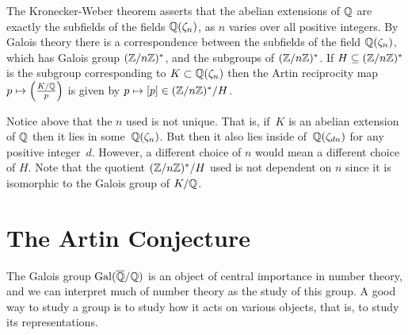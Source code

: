 The Kronecker-Weber theorem asserts that the abelian extensions of
$\mathbb{Q}$ are exactly the subfields of the fields $\mathbb{Q}(\zeta_n)$, as $n$
varies over all positive integers.  By Galois theory there is a
correspondence between the subfields of the field $\mathbb{Q}(\zeta_n)$,
which has Galois group $(\mathbb{Z}/n\mathbb{Z})^*$, and the subgroups of $(\mathbb{Z}/n\mathbb{Z})^*$.
If $H \subseteq (\mathbb{Z}/n\mathbb{Z})^*$ is the subgroup corresponding to
$K \subset \mathbb{Q}(\zeta_n)$ then the Artin reciprocity map
$p\mapsto \left(\frac{K/\mathbb{Q}}{p}\right)$ is given by $p\mapsto [p]\in (\mathbb{Z}/n\mathbb{Z})^*/H$.

\begin{remark}
	Notice above that the $n$ used is not unique. That is,
	if~$K$ is an abelian extension of $\mathbb{Q}$ then it lies in some~$\mathbb{Q}(\zeta_n)$.
	But then it also lies inside of~$\mathbb{Q}(\zeta_{dn})$ for any
	positive integer~$d$. However, a different choice of $n$
	would mean a different choice of $H$. Note that the
	quotient $(\mathbb{Z}/n\mathbb{Z})^*/H$ used is not dependent on $n$
	since it is isomorphic to the Galois group of $K/\mathbb{Q}$.
\end{remark}

\section{The Artin Conjecture}\label{sec:artin}

The Galois group $\operatorname{Gal}(\overline{\mathbb{Q}}/\mathbb{Q})$ is an object of central importance
in number theory, and we can interpret much of number theory as the
study of this group.  A good way to study a group is to study how it
acts on various objects, that is, to study its representations.

